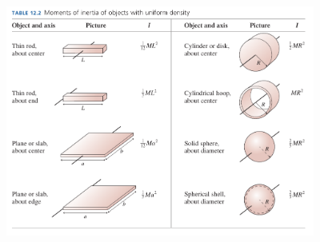 \documentclass[12pt]{article}
\begin{document}
\begin{center}
	\includegraphics[width=4in]{moment-table.png}
\end{center}

\newpage

%
%
%
%
%
%
%
%
%
%
%
%
%
%
\end{document}
